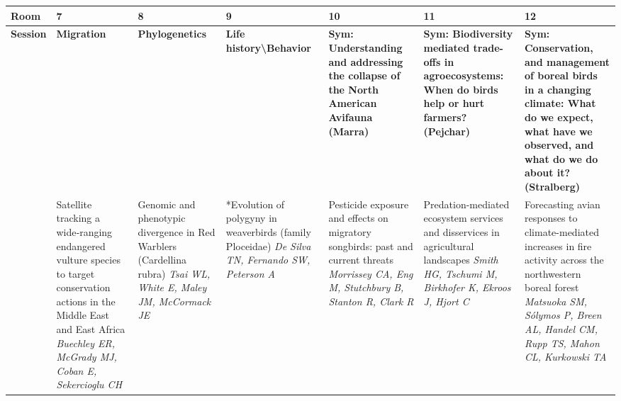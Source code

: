 \begin{tabular}{|x{0.75cm}|x{2.25cm}|x{2.25cm}|x{2.25cm}|a{2.25cm}|a{2.25cm}|a{2.25cm}|}\hline
Room & 7 & 8 & 9 & 10 & 11 & 12\\
\hline
\rule{0pt}{1em} \textbf{Session} &\footnotesize \textbf{Migration} & \footnotesize \textbf{Phylogenetics} & \footnotesize \textbf{Life history\textbackslash Behavior} & \footnotesize \textbf{Sym: Understanding and addressing the collapse of the North American Avifauna (Marra)} & \footnotesize \textbf{Sym: Biodiversity mediated trade-offs in agroecosystems: When do birds help or hurt farmers? (Pejchar)} & \footnotesize \textbf{Sym: Conservation, and management of boreal birds in a changing climate: What do we expect, what have we observed, and what do we do about it? (Stralberg)}\\
\hline
{}&Satellite tracking a wide‑ranging endangered vulture species to target conservation actions in the Middle East and East Africa \newline \newline \textit{Buechley ER, McGrady MJ, Coban E, Sekercioglu CH} & Genomic and phenotypic divergence in Red Warblers (Cardellina rubra) \newline \newline \textit{Tsai WL, White E, Maley JM, McCormack JE} & *Evolution of polygyny in weaverbirds (family Ploceidae) \newline \newline \textit{De Silva TN, Fernando SW, Peterson A} & Pesticide exposure and effects on migratory songbirds: past and current threats \newline \newline \textit{Morrissey CA, Eng M, Stutchbury B, Stanton R, Clark R} & Predation-mediated ecosystem services and disservices in agricultural landscapes \newline \newline \textit{Smith HG, Tschumi M, Birkhofer K, Ekroos J, Hjort C} & Forecasting avian responses to climate-mediated increases in fire activity across the northwestern boreal forest \newline \newline \textit{Matsuoka SM, S\'{o}lymos P, Breen AL, Handel CM, Rupp TS, Mahon CL, Kurkowski TA}\\
\hline

\end{tabular}
